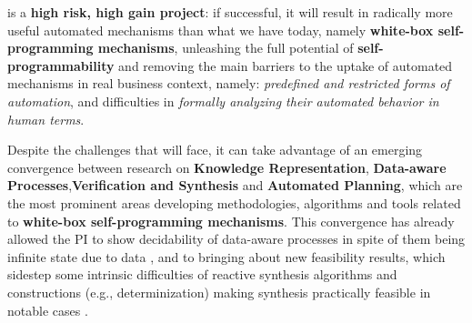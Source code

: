 \project is a \textbf{high risk, high gain project}: if successful, it
will result in radically more useful automated mechanisms than what
we have today, namely \textbf{white-box self-programming mechanisms},
unleashing the full potential of \textbf{self-programmability} and
removing the main barriers to the uptake of automated mechanisms in
real business context, namely: \textit{predefined and restricted forms of automation}, and
difficulties in \textit{formally analyzing their automated behavior in human terms}.

Despite the challenges that \project will face, 
it can take advantage of an emerging convergence between research on
\textbf{Knowledge Representation}, \textbf{Data-aware
  Processes},\textbf{Verification and Synthesis } and
\textbf{Automated Planning}, which are the most prominent areas developing
methodologies, algorithms and tools related to \textbf{white-box
  self-programming mechanisms}. This convergence has already allowed
the PI to show decidability of data-aware processes in spite of them
being infinite state due to data \cite{HaririCGDM13,DeGLP16,CDMP17}, and to bringing about new
feasibility results, which sidestep some intrinsic difficulties of
reactive synthesis algorithms and constructions (e.g.,
determinization) making synthesis practically feasible in notable
cases \cite{DeVa13,DeVa15,DeVa16}.





